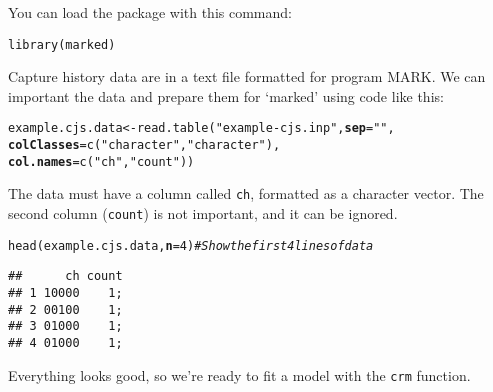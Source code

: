 \documentclass[12pt]{article}\usepackage[]{graphicx}\usepackage[]{color}
\makeatletter
\newcommand{\hlnum}[1]{\textcolor[rgb]{0.69,0.494,0}{#1}}%
\newcommand{\hlstr}[1]{\textcolor[rgb]{0.749,0.012,0.012}{#1}}%
\newcommand{\hlcom}[1]{\textcolor[rgb]{0.514,0.506,0.514}{\textit{#1}}}%
\newcommand{\hlstd}[1]{\textcolor[rgb]{0,0,0}{#1}}%
\newcommand{\hlkwb}[1]{\textcolor[rgb]{0,0.341,0.682}{#1}}%
\newcommand{\hlkwc}[1]{\textcolor[rgb]{0,0,0}{\textbf{#1}}}%
\newcommand{\hlkwd}[1]{\textcolor[rgb]{0.004,0.004,0.506}{#1}}%
\newenvironment{kframe}{%
 \def\at@end@of@kframe{}%
 \ifinner\ifhmode%
  \def\at@end@of@kframe{\end{minipage}}%
  \begin{minipage}{\columnwidth}%
 \fi\fi%
 \def\FrameCommand##1{\hskip\@totalleftmargin \hskip-\fboxsep
 \colorbox{shadecolor}{##1}\hskip-\fboxsep
     \hskip-\linewidth \hskip-\@totalleftmargin \hskip\columnwidth}%
 \MakeFramed {\advance\hsize-\width
   \@totalleftmargin\z@ \linewidth\hsize
   \@setminipage}}%
 {\par\unskip\endMakeFramed%
 \at@end@of@kframe}
\newenvironment{knitrout}{}{} %
\newcommand{\inr}[1]{\colorbox{inlinecolor}{\texttt{#1}}}
\makeatother
\begin{document}
You can load the package with this command:

\begin{knitrout}
\color{fgcolor}\begin{kframe}
\begin{alltt}
\hlkwd{library}\hlstd{(marked)}
\end{alltt}
\end{kframe}
\end{knitrout}

Capture history data are in a text file formatted for program MARK. We
can important the data and prepare them for `marked' using code like
this: 

\begin{knitrout}
\color{fgcolor}\begin{kframe}
\begin{alltt}
\hlstd{example.cjs.data} \hlkwb{<-} \hlkwd{read.table}\hlstd{(}\hlstr{"example-cjs.inp"}\hlstd{,} \hlkwc{sep}\hlstd{=}\hlstr{" "}\hlstd{,}
                               \hlkwc{colClasses}\hlstd{=}\hlkwd{c}\hlstd{(}\hlstr{"character"}\hlstd{,}\hlstr{"character"}\hlstd{),}
                               \hlkwc{col.names}\hlstd{=}\hlkwd{c}\hlstd{(}\hlstr{"ch"}\hlstd{,} \hlstr{"count"}\hlstd{))}
\end{alltt}
\end{kframe}
\end{knitrout}

The data must have a column called \inr{ch}, formatted as a character
vector. The second column (\inr{count}) is not important, and it
can be ignored.

\begin{knitrout}
\color{fgcolor}\begin{kframe}
\begin{alltt}
\hlkwd{head}\hlstd{(example.cjs.data,} \hlkwc{n}\hlstd{=}\hlnum{4}\hlstd{)} \hlcom{# Show the first 4 lines of data}
\end{alltt}
\begin{verbatim}
##      ch count
## 1 10000    1;
## 2 00100    1;
## 3 01000    1;
## 4 01000    1;
\end{verbatim}
\end{kframe}
\end{knitrout}

Everything looks good, so we're ready to fit a model with the
\inr{crm} function. 
\end{document}
